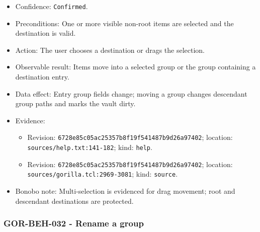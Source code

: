 \documentclass[
  letterpaper,
]{article}
\newcommand{\passthrough}[1]{#1}
\providecommand{\tightlist}{%
  \setlength{\itemsep}{0pt}\setlength{\parskip}{0pt}}
\begin{document}
\begin{itemize}
\tightlist
\item
  Confidence: \passthrough{\lstinline!Confirmed!}.
\item
  Preconditions: One or more visible non-root items are selected and the destination is valid.
\item
  Action: The user chooses a destination or drags the selection.
\item
  Observable result: Items move into a selected group or the group containing a destination entry.
\item
  Data effect: Entry group fields change; moving a group changes descendant group paths and marks the vault dirty.
\item
  Evidence:

  \begin{itemize}
  \tightlist
  \item
    Revision: \nolinkurl{6728e85c05ac25357b8f19f541487b9d26a97402}; location: \nolinkurl{sources/help.txt:141-182};
    kind: \passthrough{\lstinline!help!}.
  \item
    Revision: \nolinkurl{6728e85c05ac25357b8f19f541487b9d26a97402}; location: \nolinkurl{sources/gorilla.tcl:2969-3081};
    kind: \passthrough{\lstinline!source!}.
  \end{itemize}
\item
  Bonobo note: Multi-selection is evidenced for drag movement; root and descendant destinations are protected.
\end{itemize}

\subsubsection{GOR-BEH-032 - Rename a group}\label{gor-beh-032---rename-a-group}
\end{document}
